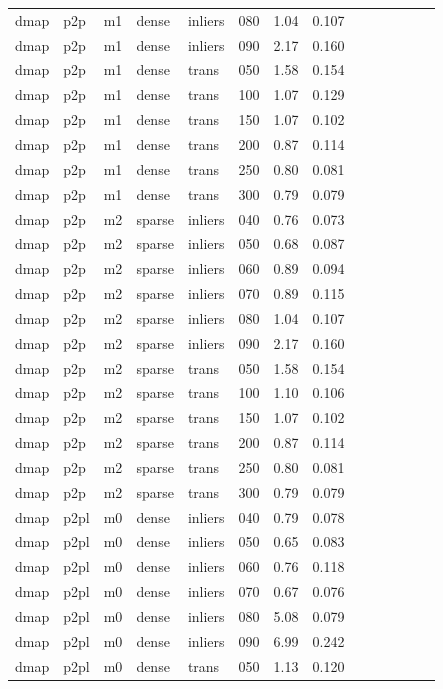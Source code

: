 \begin{table}[htbp]
\begin{tabular}{llllllrrrrrrrr}
  dmap & p2p & m1 & dense & inliers & 080 & 1.04 & 0.107 \\
  dmap & p2p & m1 & dense & inliers & 090 & 2.17 & 0.160 \\
  dmap & p2p & m1 & dense & trans & 050 & 1.58 & 0.154 \\
  dmap & p2p & m1 & dense & trans & 100 & 1.07 & 0.129 \\
  dmap & p2p & m1 & dense & trans & 150 & 1.07 & 0.102 \\
  dmap & p2p & m1 & dense & trans & 200 & 0.87 & 0.114 \\
  dmap & p2p & m1 & dense & trans & 250 & 0.80 & 0.081 \\
  dmap & p2p & m1 & dense & trans & 300 & 0.79 & 0.079 \\
  dmap & p2p & m2 & sparse & inliers & 040 & 0.76 & 0.073 \\
  dmap & p2p & m2 & sparse & inliers & 050 & 0.68 & 0.087 \\
  dmap & p2p & m2 & sparse & inliers & 060 & 0.89 & 0.094 \\
  dmap & p2p & m2 & sparse & inliers & 070 & 0.89 & 0.115 \\
  dmap & p2p & m2 & sparse & inliers & 080 & 1.04 & 0.107 \\
  dmap & p2p & m2 & sparse & inliers & 090 & 2.17 & 0.160 \\
  dmap & p2p & m2 & sparse & trans & 050 & 1.58 & 0.154 \\
  dmap & p2p & m2 & sparse & trans & 100 & 1.10 & 0.106 \\
  dmap & p2p & m2 & sparse & trans & 150 & 1.07 & 0.102 \\
  dmap & p2p & m2 & sparse & trans & 200 & 0.87 & 0.114 \\
  dmap & p2p & m2 & sparse & trans & 250 & 0.80 & 0.081 \\
  dmap & p2p & m2 & sparse & trans & 300 & 0.79 & 0.079 \\
  dmap & p2pl & m0 & dense & inliers & 040 & 0.79 & 0.078 \\
  dmap & p2pl & m0 & dense & inliers & 050 & 0.65 & 0.083 \\
  dmap & p2pl & m0 & dense & inliers & 060 & 0.76 & 0.118 \\
  dmap & p2pl & m0 & dense & inliers & 070 & 0.67 & 0.076 \\
  dmap & p2pl & m0 & dense & inliers & 080 & 5.08 & 0.079 \\
  dmap & p2pl & m0 & dense & inliers & 090 & 6.99 & 0.242 \\
  dmap & p2pl & m0 & dense & trans & 050 & 1.13 & 0.120 \\

\end{tabular}
\end{table}
